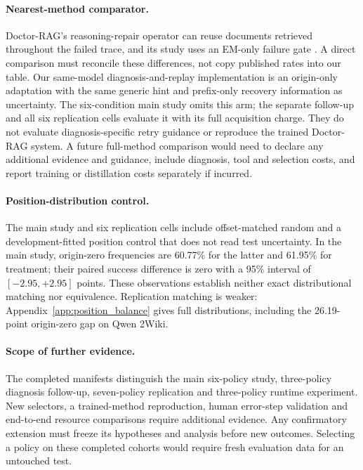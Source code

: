 \documentclass{article}
\begin{document}
\paragraph{Nearest-method comparator.}
Doctor-RAG's reasoning-repair operator can reuse documents retrieved
throughout the failed trace, and its study uses an EM-only failure gate
\citep{jiao2026doctor}. A direct comparison must reconcile these differences,
not copy published rates into our table. Our same-model diagnosis-and-replay
implementation is an origin-only adaptation with the same generic hint and
prefix-only recovery information as uncertainty. The six-condition main
study omits this arm; the separate follow-up and all six replication cells
evaluate it with its full acquisition charge. They do not evaluate
diagnosis-specific retry guidance or reproduce the trained Doctor-RAG
system. A future full-method comparison would need to declare any additional
evidence and guidance, include diagnosis, tool and selection costs, and
report training or distillation costs separately if incurred.

\paragraph{Position-distribution control.}
The main study and six replication cells include offset-matched random and a
development-fitted position control that does not read test uncertainty.
In the main study, origin-zero frequencies are 60.77\% for the latter and
61.95\% for treatment; their paired success difference is zero with a
95\% interval of $[-2.95,+2.95]$ points. These observations establish neither
exact distributional matching nor equivalence. Replication matching is weaker:
Appendix~\ref{app:position_balance} gives full distributions, including the
26.19-point origin-zero gap on Qwen 2Wiki.

\paragraph{Scope of further evidence.}
The completed manifests distinguish the main six-policy study, three-policy
diagnosis follow-up, seven-policy replication and three-policy runtime
experiment. New selectors, a trained-method reproduction, human error-step
validation and end-to-end resource comparisons require additional evidence.
Any confirmatory extension must freeze its hypotheses and analysis before
new outcomes. Selecting a policy on these completed cohorts would require
fresh evaluation data for an untouched test.
\end{document}
